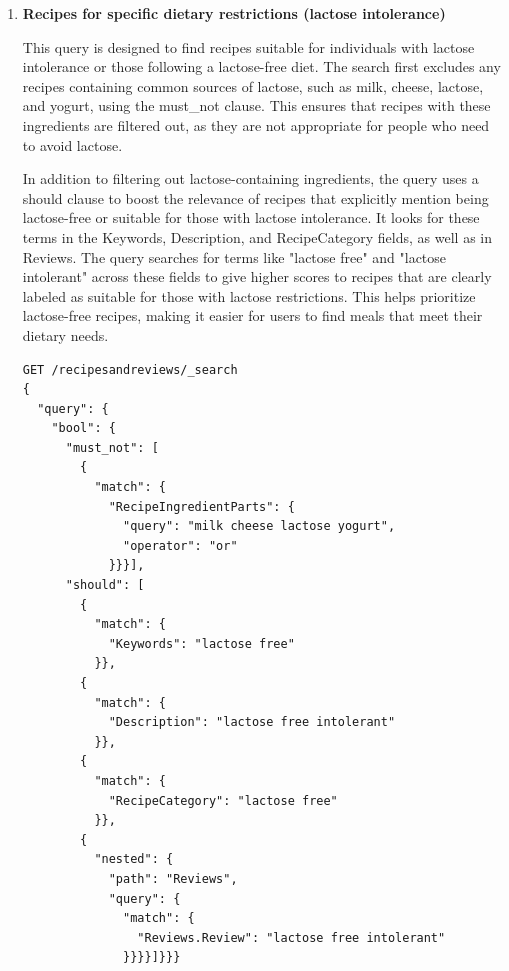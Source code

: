 \begin{enumerate}
    \item \textbf{Recipes for specific dietary restrictions (lactose intolerance)}

    This query is designed to find recipes suitable for individuals with lactose intolerance or those following a lactose-free diet. The search first excludes any recipes containing common sources of lactose, such as milk, cheese, lactose, and yogurt, using the must\_not clause. This ensures that recipes with these ingredients are filtered out, as they are not appropriate for people who need to avoid lactose.

    In addition to filtering out lactose-containing ingredients, the query uses a should clause to boost the relevance of recipes that explicitly mention being lactose-free or suitable for those with lactose intolerance. It looks for these terms in the Keywords, Description, and RecipeCategory fields, as well as in Reviews. The query searches for terms like "lactose free" and "lactose intolerant" across these fields to give higher scores to recipes that are clearly labeled as suitable for those with lactose restrictions. This helps prioritize lactose-free recipes, making it easier for users to find meals that meet their dietary needs.

    \begin{verbatim}
GET /recipesandreviews/_search
{
  "query": {
    "bool": {
      "must_not": [
        {
          "match": {
            "RecipeIngredientParts": {
              "query": "milk cheese lactose yogurt",
              "operator": "or"
            }}}],
      "should": [
        {
          "match": {
            "Keywords": "lactose free"
          }},
        {
          "match": {
            "Description": "lactose free intolerant"
          }},
        {
          "match": {
            "RecipeCategory": "lactose free"
          }},
        {
          "nested": {
            "path": "Reviews",
            "query": {
              "match": {
                "Reviews.Review": "lactose free intolerant"
              }}}}]}}}
    \end{verbatim}


\end{enumerate}
